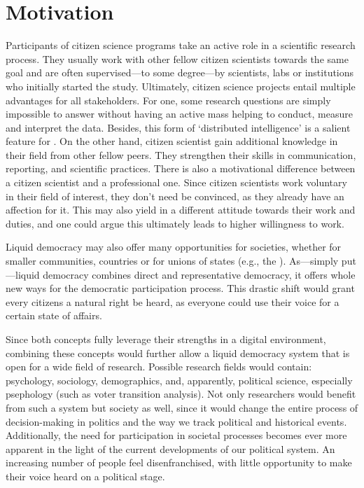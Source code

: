 \section{Motivation}
\label{sec:Motivation}

Participants of citizen science programs take an active role in a scientific research process. They usually work with other fellow citizen scientists towards the same goal and are often supervised---to some degree---by scientists, labs or institutions who initially started the study. Ultimately, citizen science projects entail multiple advantages for all stakeholders. For one, some research questions are simply impossible to answer without having an active mass helping to conduct, measure and interpret the data. Besides, this form of ‘distributed intelligence’ is a salient feature for . On the other hand, citizen scientist gain additional knowledge in their field from other fellow peers. They strengthen their skills in communication, reporting, and scientific practices. There is also a motivational difference between a citizen scientist and a professional one. Since citizen scientists work voluntary in their field of interest, they don’t need be convinced, as they already have an affection for it. This may also yield in a different attitude towards their work and duties, and one could argue this ultimately leads to higher willingness to work.

Liquid democracy may also offer many opportunities for societies, whether for smaller communities, countries or for unions of states (e.g., the ). As---simply put---liquid democracy combines direct and representative democracy, it offers whole new ways for the democratic participation process. This drastic shift would grant every citizens a natural right be heard, as everyone could use their voice for a certain state of affairs.

Since both concepts fully leverage their strengths in a digital environment, combining these concepts would further allow a liquid democracy system that is open for a wide field of research. Possible research fields would contain: psychology, sociology, demographics, and, apparently, political science, especially psephology (such as voter transition analysis).  Not only researchers would benefit from such a system but society as well, since it would change the entire process of decision-making in politics and the way we track political and historical events. Additionally, the need for participation in societal processes becomes ever more apparent in the light of the current developments of our political system. An increasing number of people feel disenfranchised, with little opportunity to make their voice heard on a political stage.



